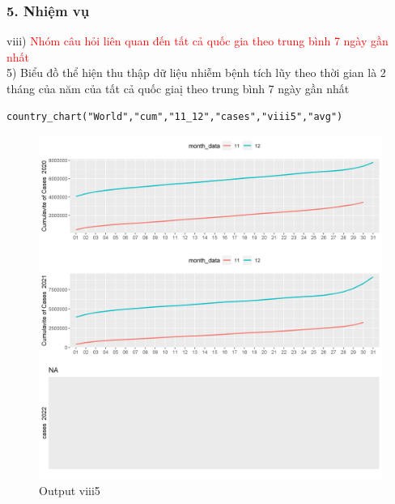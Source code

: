 \documentclass[english,10pt,table]{beamer}
\begin{document}
\begin{frame}[fragile]
\frametitle{5.  Nhiệm vụ}
viii) \textcolor{red}{Nhóm câu hỏi liên quan đến tất cả quốc gia theo trung bình 7 ngày gần nhất}\\
    5) Biểu đồ thể hiện thu thập dữ liệu nhiễm bệnh tích lũy theo thời gian là 2 tháng của năm của tất cả quốc giaị theo trung bình 7 ngày gần nhất
 \begin{lstlisting}[frame = single,basicstyle=\tiny]
country_chart("World","cum","11_12","cases","viii5","avg")    
    \end{lstlisting}
			\begin{figure}[h!]
	\begin{center}
		    \includegraphics[scale = 0.21]{Images/VIII/viii5 World .jpeg}
		     \caption{Output viii5}
		\end{center}
		\end{figure}
\end{frame}
\end{document}
